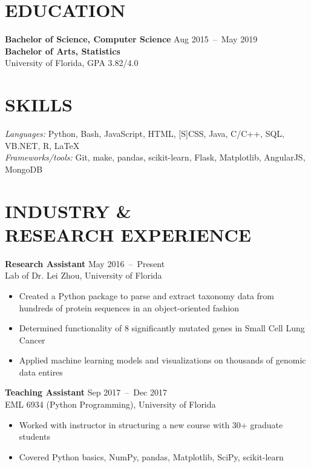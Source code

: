 \documentclass[line,resmargin]{res}
\begin{document}
\address{}
\address{}

\begin{resume}

\section{EDUCATION}
    \textbf{Bachelor of Science, Computer Science}    \hfill Aug 2015~--~May 2019 \\
    \textbf{Bachelor of Arts, Statistics} \\
    University of Florida, GPA 3.82/4.0

\section{SKILLS}
    {\sl Languages:} Python, Bash, JavaScript, HTML, [S]CSS, Java, C/C++, SQL, VB.NET, R, LaTeX \\
    {\sl Frameworks/tools:} Git, make, pandas, scikit-learn, Flask, Matplotlib, AngularJS, MongoDB

\section{INDUSTRY \& \\ RESEARCH EXPERIENCE}
    \textbf{Research Assistant}    \hfill May 2016~--~Present \\
    Lab of Dr. Lei Zhou, University of Florida
    \begin{itemize}  \itemsep -2pt
        \item Created a Python package to parse and extract taxonomy data from hundreds of protein sequences in an object-oriented fashion
        \item Determined functionality of 8 significantly mutated genes in Small Cell Lung Cancer
        \item Applied machine learning models and visualizations on thousands of genomic data entires
    \end{itemize}

    \textbf{Teaching Assistant}    \hfill Sep 2017~--~Dec 2017 \\
    EML 6934 (Python Programming), University of Florida
    \begin{itemize}  \itemsep -2pt
        \item Worked with instructor in structuring a new course with 30+ graduate students
        \item Covered Python basics, NumPy, pandas, Matplotlib, SciPy, scikit-learn
    \end{itemize}


\end{resume}
\end{document}

